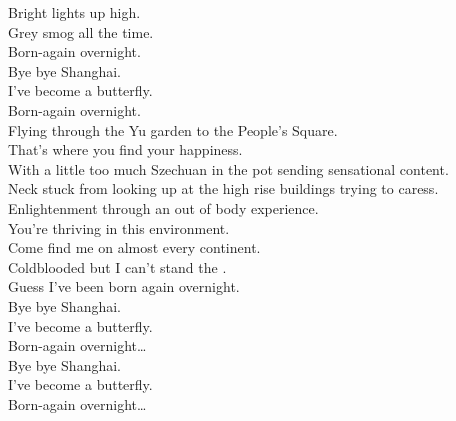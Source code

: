 Bright lights up high. \\
Grey smog all the time. \\
Born-again overnight. \\
Bye bye Shanghai. \\
I've become a butterfly. \\
Born-again overnight. \\

Flying through the Yu garden to the People's Square. \\
That's where you find your happiness. \\
With a little too much Szechuan in the pot sending sensational content. \\
Neck stuck from looking up at the high rise buildings trying to caress. \\
Enlightenment through an out of body experience. \\
You're thriving in this environment. \\
Come find me on almost every continent. \\
Coldblooded but I can't stand the . \\
Guess I've been born again overnight. \\

Bye bye Shanghai. \\
I've become a butterfly. \\
Born-again overnight… \\
Bye bye Shanghai. \\
I've become a butterfly. \\
Born-again overnight… \\




